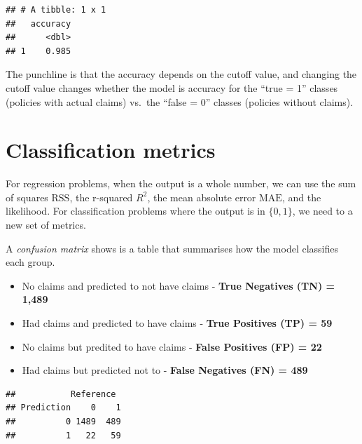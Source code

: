\documentclass[openany]{book}
\newenvironment{Shaded}{\begin{snugshade}}{\end{snugshade}}
\newcommand{\KeywordTok}[1]{\textcolor[rgb]{0.13,0.29,0.53}{\textbf{#1}}}
\newcommand{\NormalTok}[1]{#1}
\newcommand{\OperatorTok}[1]{\textcolor[rgb]{0.81,0.36,0.00}{\textbf{#1}}}
\providecommand{\tightlist}{%
  \setlength{\itemsep}{0pt}\setlength{\parskip}{0pt}}
\begin{document}
\begin{verbatim}
## # A tibble: 1 x 1
##   accuracy
##      <dbl>
## 1    0.985
\end{verbatim}

The punchline is that the accuracy depends on the cutoff value, and changing the cutoff value changes whether the model is accuracy for the ``true = 1'' classes (policies with actual claims) vs.~the ``false = 0'' classes (policies without claims).

\hypertarget{classification-metrics}{%
\section{Classification metrics}\label{classification-metrics}}

For regression problems, when the output is a whole number, we can use the sum of squares \(\text{RSS}\), the r-squared \(R^2\), the mean absolute error \(\text{MAE}\), and the likelihood. For classification problems where the output is in \(\{0,1\}\), we need to a new set of metrics.

A \emph{confusion matrix} shows is a table that summarises how the model classifies each group.

\begin{itemize}
\tightlist
\item
  No claims and predicted to not have claims - \textbf{True Negatives (TN) = 1,489}
\item
  Had claims and predicted to have claims - \textbf{True Positives (TP) = 59}
\item
  No claims but predited to have claims - \textbf{False Positives (FP) = 22}
\item
  Had claims but predicted not to - \textbf{False Negatives (FN) = 489}
\end{itemize}

\begin{Shaded}
\end{Shaded}

\begin{verbatim}
##           Reference
## Prediction    0    1
##          0 1489  489
##          1   22   59
\end{verbatim}
\end{document}

